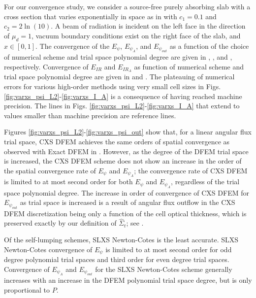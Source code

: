 For our convergence study, we consider a source-free purely absorbing slab with a cross section that varies exponentially in space as in  with $c_1 = 0.1$ and $c_2 = 2\ln(10)$.  
A beam of radiation is incident on the left face in the direction of $\mu_d=1$, vacuum boundary conditions exist on the right face of the slab, and $x\in[0, 1]$.  
The convergence of the $E_{\psi}$,  $E_{\psi_A}$, and $E_{\psi_{out}}$ as a function of the choice of numerical scheme and trial space polynomial degree are given in ,  , and , respectively.  
Convergence of $E_{IR}$ and $E_{IR_A}$ as function of numerical scheme and trial space polynomial degree are given in  and . 
The plateauing of numerical errors for various high-order methods using very small cell sizes in Figs. \ref{fig:varxs_psi_L2}-\ref{fig:varxs_I_A} is a consequence of having  reached machine precision.
The lines in Figs. \ref{fig:varxs_psi_L2}-\ref{fig:varxs_I_A} that extend to values smaller than machine precision are reference lines.

Figures \ref{fig:varxs_psi_L2}-\ref{fig:varxs_psi_out} show that, for a linear angular flux trial space, CXS DFEM achieves the same orders of spatial convergence as observed with Exact DFEM in \cite{part_1_paper}.
However, as the degree of the DFEM trial space is increased, the CXS DFEM scheme does not show an increase in the order of the spatial convergence rate of  $E_{\psi}$ and $E_{\psi_A}$; the convergence rate of CXS DFEM is limited to at most second order for both $E_{\psi}$ and $E_{\psi_A}$, regardless of the trial space polynomial degree.  
The increase in order of convergence of CXS DFEM for $E_{\psi_{out}}$ as trial space is increased is a result of angular flux outflow in the
CXS DFEM discretization being only a function of the cell optical thickness, which is preserved exactly by our definition of $\hat{\Sigma}_t$; see .

Of the self-lumping schemes, SLXS Newton-Cotes is the least accurate.  SLXS Newton-Cotes convergence of $E_{\psi}$ is limited to at most second order for odd degree polynomial trial spaces and third order for even degree trial spaces.  
Convergence of $E_{\psi_A}$ and $E_{\psi_{out}}$ for the SLXS Newton-Cotes scheme generally increases with an increase in the DFEM polynomial trial space degree, but is only proportional to $P$.

